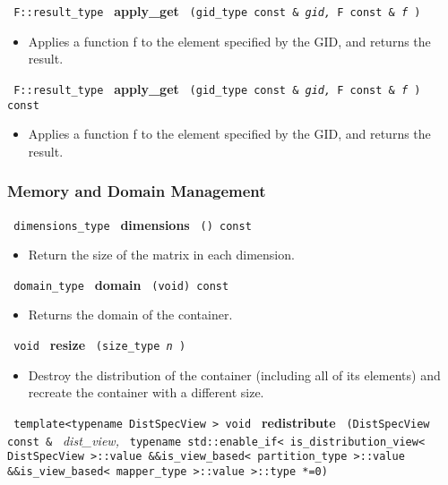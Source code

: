 \noindent
\texttt{%
F::result\_type
}
\textbf{apply\_get}%
\texttt{%
(gid\_type const \&
\textit{gid,}%
F const \&
\textit{f}%
)
}

\begin{itemize}
\item
Applies a function f to the element specified by the GID, and returns the result.
\end{itemize}
 
\noindent
\texttt{%
F::result\_type
}
\textbf{apply\_get}%
\texttt{%
(gid\_type const \&
\textit{gid,}%
F const \&
\textit{f}%
) const
}

\begin{itemize}
\item
Applies a function f to the element specified by the GID, and returns the result.
\end{itemize}
 
 
\subsubsection{Memory and Domain Management}

\noindent
\texttt{%
dimensions\_type
}
\textbf{dimensions}
\texttt{%
() const
}

\begin{itemize}
\item
Return the size of the matrix in each dimension.
\end{itemize}
 
\noindent
\texttt{%
domain\_type 	
}
\textbf{domain}%
\texttt{%
(void) const
}

\begin{itemize}
\item
Returns the domain of the container.
\end{itemize}
 
\noindent
\texttt{%
void 
}
\textbf{resize}%
\texttt{%
(size\_type 
\textit{n}
)
}

\begin{itemize}
\item
Destroy the distribution of the container (including all of its elements) and recreate the container with a different size.
\end{itemize}
 
\noindent
\texttt{%
template<typename DistSpecView >
void
}
\textbf{redistribute}%
\texttt{%
(DistSpecView const \&
}
\textit{dist\_view,}
\texttt{
typename std::enable\_if< is\_distribution\_view< DistSpecView >::value \&\&is\_view\_based< partition\_type >::value \&\&is\_view\_based< mapper\_type >::value >::type *=0)
}

